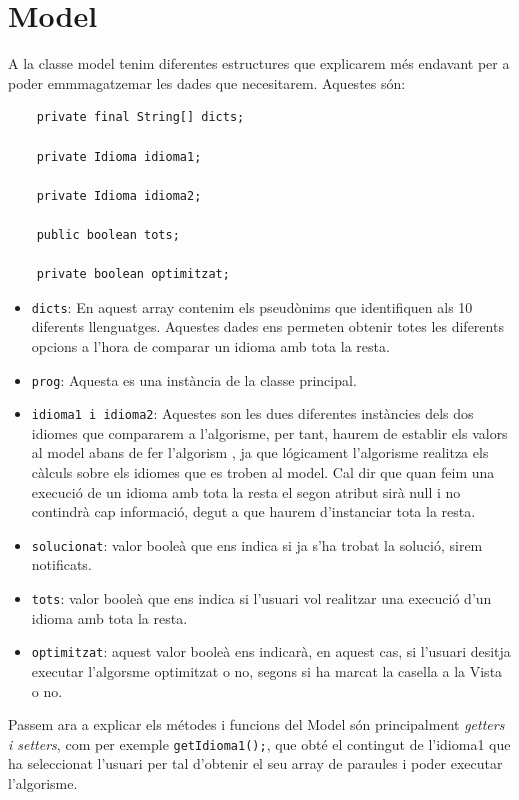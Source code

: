 \documentclass[conference]{IEEEtran}
\begin{document}
\section{Model}
 A la classe model tenim diferentes estructures que explicarem més endavant per a poder emmmagatzemar les dades que necesitarem. Aquestes són:
    \begin{verbatim}
    private final String[] dicts;

    private Idioma idioma1;

    private Idioma idioma2;

    public boolean tots;

    private boolean optimitzat;
    \end{verbatim}

    \begin{itemize}
        \item \texttt{dicts}: En aquest array contenim els pseudònims que identifiquen als 10 diferents llenguatges. Aquestes dades ens permeten obtenir totes les diferents opcions a l'hora de comparar un idioma amb tota la resta.\\
        \item \texttt{prog}: Aquesta es una instància de la classe principal.\\
        \item \texttt{idioma1 i idioma2}: Aquestes son les dues diferentes instàncies dels dos idiomes que compararem a l'algorisme, per tant, haurem de establir els valors al model abans de fer l'algorism , ja que lógicament l'algorisme realitza els càlculs sobre els idiomes que es troben al model. Cal dir que quan feim una execució de un idioma amb tota la resta el segon atribut sirà null i no contindrà cap informació, degut a que haurem d'instanciar tota la resta.\\
        \item \texttt{solucionat}: valor booleà que ens indica si ja s'ha trobat la solució, sirem notificats.\\
        \item \texttt{tots}: valor booleà que ens indica si l'usuari vol realitzar una execució d'un idioma amb tota la resta.\\
        \item \texttt{optimitzat}: aquest valor booleà ens indicarà, en aquest cas, si l'usuari desitja executar l'algorsme optimitzat o no, segons si ha marcat la casella a la Vista o no.\\

    \end{itemize}
    Passem ara a explicar els métodes i funcions del Model són principalment \textit{getters i setters}, com per exemple \texttt{getIdioma1();}, que obté el contingut de l'idioma1 que ha seleccionat l'usuari per tal d'obtenir el seu array de paraules i poder executar l'algorisme.
\end{document}
